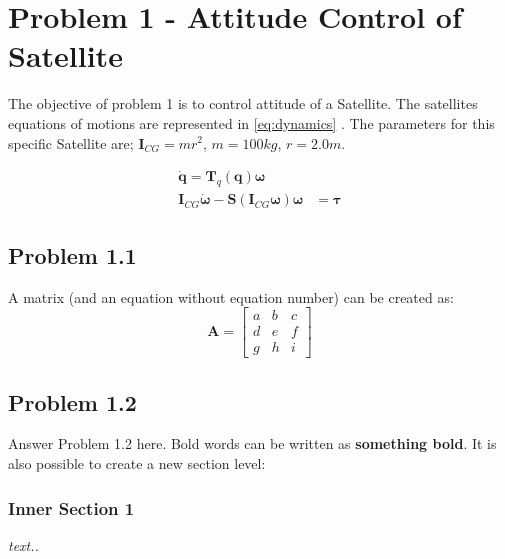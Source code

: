 \section*{Problem 1 - Attitude Control of Satellite}

The objective of problem 1 is to control attitude of a Satellite. The satellites equations of motions are represented in \eqref{eq:dynamics} \cite{Fossen2011}. The parameters for this specific Satellite are; $\mathbf{I}_{CG} = mr^2$, $m = 100 kg$, $r = 2.0 m$. 

\begin{equation}
\label{eq:dynamics}
	\begin{aligned}
		\dot{\mathbf{q}} = \mathbf{T}_q (\mathbf{q} ) \boldsymbol{\omega} \\
		\mathbf{I}_{CG} \dot{\boldsymbol{\omega}} - \mathbf{S} (\mathbf{I}_{CG} \boldsymbol{\omega} ) \boldsymbol{\omega} & =  \boldsymbol{\tau}
	\end{aligned}	
\end{equation}



\subsection*{Problem 1.1} 



A matrix (and an equation without equation number) can be created as: 
\begin{equation*}	%
	\mathbf{A} = 
	\begin{bmatrix}
		a & b & c \\ d & e & f \\ g & h & i
	\end{bmatrix}
\end{equation*}

\subsection*{Problem 1.2}
Answer Problem 1.2 here. Bold words can be written as \textbf{something bold}. It is also possible to create a new section level:
\subsubsection*{Inner Section 1}
\emph{text..}

